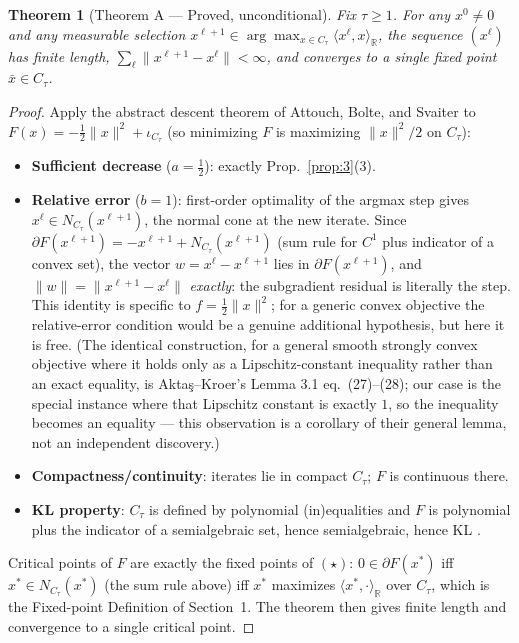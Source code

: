 \documentclass[11pt]{article}
\theoremstyle{plain}
\newtheorem{theorem}{Theorem}[section]
\theoremstyle{definition}
\theoremstyle{remark}
\newcommand{\R}{\mathbb R}
\newcommand{\iC}{\iota_{C_\tau}}
\begin{document}
\begin{theorem}[Theorem A --- Proved, unconditional]\label{thm:A}
Fix $\tau\ge1$. For any $x^0\ne0$ and any measurable selection
$x^{\ell+1}\in\arg\max_{x\in C_\tau}\langle x^\ell,x\rangle_\R$, the sequence
$(x^\ell)$ has finite length, $\sum_\ell\|x^{\ell+1}-x^\ell\|<\infty$, and
converges to a single fixed point $\bar x\in C_\tau$.
\end{theorem}
\begin{proof}
Apply the abstract descent theorem of Attouch, Bolte, and Svaiter
\cite[Thm.~2.9]{ABS13} to $F(x)=-\tfrac12\|x\|^2+\iC$ (so minimizing $F$ is
maximizing $\|x\|^2/2$ on $C_\tau$):
\begin{itemize}
\item \textbf{Sufficient decrease} ($a=\tfrac12$): exactly Prop.~\ref{prop:3}(3).
\item \textbf{Relative error} ($b=1$): first-order
optimality of the argmax step gives $x^\ell\in N_{C_\tau}(x^{\ell+1})$, the
normal cone at the new iterate. Since $\partial F(x^{\ell+1})=-x^{\ell+1}+N_{C_\tau}(x^{\ell+1})$
(sum rule for $C^1$ plus indicator of a convex set), the vector
$w=x^\ell-x^{\ell+1}$ lies in $\partial F(x^{\ell+1})$, and
$\|w\|=\|x^{\ell+1}-x^\ell\|$ \emph{exactly}: the subgradient residual is
literally the step. This identity is specific to $f=\tfrac12\|x\|^2$; for a
generic convex objective the relative-error condition would be a genuine
additional hypothesis, but here it is free. (The identical construction,
for a general smooth strongly convex objective where it holds only as a
Lipschitz-constant inequality rather than an exact equality, is
Aktaş--Kroer's \cite{AK25} Lemma 3.1 eq.~(27)--(28); our case is the
special instance where that Lipschitz constant is exactly $1$, so the
inequality becomes an equality --- this observation is a corollary of
their general lemma, not an independent discovery.)
\item \textbf{Compactness/continuity}: iterates lie in compact $C_\tau$;
$F$ is continuous there.
\item \textbf{KL property}: $C_\tau$ is defined by polynomial (in)equalities
and $F$ is polynomial plus the indicator of a semialgebraic set, hence
semialgebraic, hence KL \cite{BDLS07}.
\end{itemize}
Critical points of $F$ are exactly the fixed points of $(\star)$: $0\in\partial F(x^*)$
iff $x^*\in N_{C_\tau}(x^*)$ (the sum rule above) iff $x^*$ maximizes
$\langle x^*,\cdot\rangle_\R$ over $C_\tau$, which is the Fixed-point
Definition of Section~1. The theorem then gives finite length and
convergence to a single critical point.
\end{proof}
\end{document}
